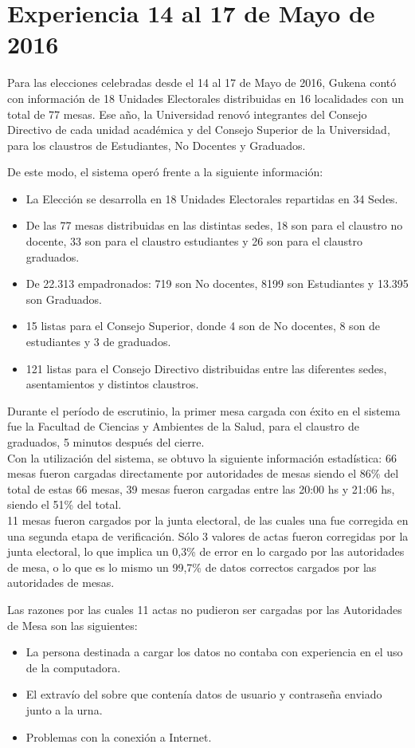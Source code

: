\section{Experiencia 14 al 17 de Mayo de 2016}
Para las elecciones celebradas desde el 14 al 17 de Mayo de 2016, Gukena contó con información de 18 Unidades Electorales distribuidas en 16 localidades con un total de 77 mesas. 
Ese año, la Universidad renovó integrantes del Consejo Directivo de cada unidad académica y del Consejo Superior de la Universidad, para los claustros de Estudiantes, No Docentes y Graduados. 

De este modo, el sistema operó frente a la siguiente información:
\begin{itemize}
    \item La Elección se desarrolla en 18 Unidades Electorales repartidas en 34 Sedes.
    \item De las 77 mesas distribuidas en las distintas sedes, 18 son para el claustro no docente, 33 son para el claustro estudiantes y 26 son para el claustro graduados.
    \item De 22.313 empadronados: 719 son No docentes, 8199 son Estudiantes y 13.395 son Graduados. 
    \item 15 listas para el Consejo Superior, donde 4 son de No docentes, 8 son de estudiantes y 3 de graduados.
    \item 121 listas para el Consejo Directivo distribuidas entre las diferentes sedes, asentamientos y distintos claustros.
\end{itemize}

Durante el período de escrutinio, la primer mesa cargada con éxito en el sistema fue la Facultad de Ciencias y Ambientes de la Salud, para el claustro de graduados, 5 minutos después del cierre.\\ 
Con la utilización del sistema, se obtuvo la siguiente información estadística:
66 mesas fueron cargadas directamente por autoridades de mesas siendo el 86\% del total
de estas 66 mesas, 39 mesas fueron cargadas entre las 20:00 hs y 21:06 hs, siendo el 51\% del total.\\
11 mesas fueron cargados por la junta electoral, de las cuales una fue corregida en una segunda etapa de verificación.
Sólo 3 valores de actas fueron corregidas por la junta electoral, lo que implica un 0,3\% de error en lo cargado por las autoridades de mesa, o lo que es lo mismo un 99,7\% de datos correctos cargados por las autoridades de mesas.

Las razones por las cuales 11 actas no pudieron ser cargadas por las Autoridades de Mesa son las siguientes:
\begin{itemize}
\item La persona destinada a cargar los datos no contaba con experiencia en el uso de la computadora.
\item El extravío del sobre que contenía datos de usuario y contraseña enviado junto a la urna.
\item Problemas con la conexión a Internet.
\end{itemize}

